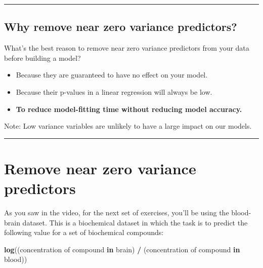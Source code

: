 \documentclass[
]{book}
\newenvironment{Shaded}{\begin{snugshade}}{\end{snugshade}}
\newcommand{\ControlFlowTok}[1]{\textcolor[rgb]{0.13,0.29,0.53}{\textbf{#1}}}
\newcommand{\KeywordTok}[1]{\textcolor[rgb]{0.13,0.29,0.53}{\textbf{#1}}}
\newcommand{\NormalTok}[1]{#1}
\newcommand{\OperatorTok}[1]{\textcolor[rgb]{0.81,0.36,0.00}{\textbf{#1}}}
\newcommand{\StringTok}[1]{\textcolor[rgb]{0.31,0.60,0.02}{#1}}
\begin{document}
\begin{center}\rule{0.5\linewidth}{0.5pt}\end{center}

\hypertarget{why-remove-near-zero-variance-predictors}{%
\subsection*{Why remove near zero variance predictors?}\label{why-remove-near-zero-variance-predictors}}

What's the best reason to remove near zero variance predictors from your data before building a model?

\begin{itemize}
\item
  Because they are guaranteed to have no effect on your model.
\item
  Because their p-values in a linear regression will always be low.
\item
  \textbf{To reduce model-fitting time without reducing model accuracy.}
\end{itemize}

Note: Low variance variables are unlikely to have a large impact on our models.

\begin{center}\rule{0.5\linewidth}{0.5pt}\end{center}

\hypertarget{remove-near-zero-variance-predictors}{%
\section{Remove near zero variance predictors}\label{remove-near-zero-variance-predictors}}

As you saw in the video, for the next set of exercises, you'll be using the blood-brain dataset. This is a biochemical dataset in which the task is to predict the following value for a set of biochemical compounds:

\begin{Shaded}
\begin{Highlighting}[]
\KeywordTok{log}\NormalTok{((concentration of compound }\ControlFlowTok{in}\NormalTok{ brain) }\OperatorTok{/}
\StringTok{      }\NormalTok{(concentration of compound }\ControlFlowTok{in}\NormalTok{ blood))}
\end{Highlighting}
\end{Shaded}
\end{document}
